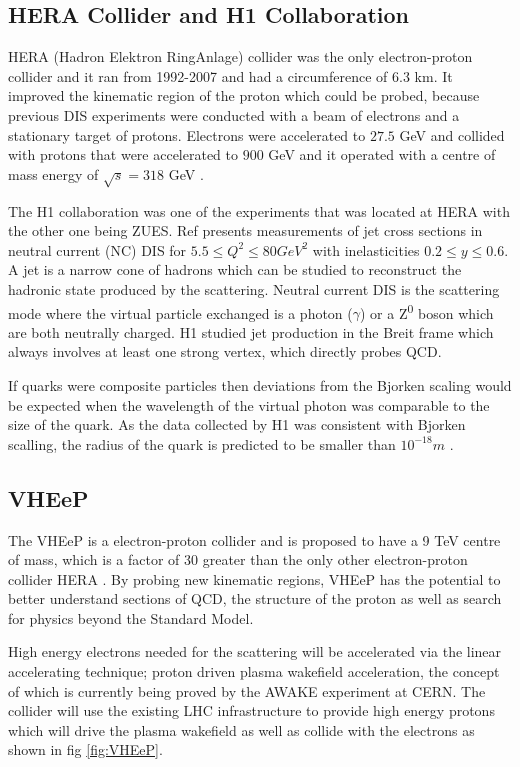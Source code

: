 \documentclass[journal, a4paper,11pt]{IEEEtran}
\begin{document}
\subsection*{\textbf{HERA Collider and H1 Collaboration}}

HERA (Hadron Elektron RingAnlage) collider was the only electron-proton collider and it ran from 1992-2007 and had a circumference of 6.3 km. It improved the kinematic region of the proton which could be probed, because previous DIS experiments were conducted with a beam of electrons and a stationary target of protons. Electrons were accelerated to $27.5$ GeV and collided with protons that were accelerated to $900$ GeV \cite{Modern} and it operated with a centre of mass energy of $\sqrt{s} = 318$ GeV \cite{1308}.

The H1 collaboration \cite{H1} was one of the experiments that was located at HERA with the other one being ZUES. Ref \cite{H1} presents measurements of jet cross sections in neutral current (NC) DIS for $5.5 \leq Q^2 \leq 80 GeV^2$ with inelasticities $0.2 \leq y \leq 0.6$. A jet is a narrow cone of hadrons which can be studied to reconstruct the hadronic state produced by the scattering. Neutral current DIS is the scattering mode where the virtual particle exchanged is a photon ($\gamma$) or a Z\textsuperscript{0} boson which are both neutrally charged. H1 studied jet production in the Breit frame which always involves at least one strong vertex, which directly probes QCD.

If quarks were composite particles then deviations from the Bjorken scaling would be expected when the wavelength of the virtual photon was comparable to the size of the quark. As the data collected by H1 was consistent with Bjorken scalling, the radius of the quark is predicted to be smaller than $10^{-18}m$ \cite{Modern}.

\subsection*{\textbf{VHEeP}}

The VHEeP \cite{VHEeP} is a electron-proton collider and is proposed to have a 9 TeV centre of mass, which is a factor of 30 greater than the only other electron-proton collider HERA \cite{HERA}. By probing new kinematic regions, VHEeP has the potential to better understand sections of QCD, the structure of the proton as well as search for physics beyond the Standard Model.

High energy electrons needed for the scattering will be accelerated via the linear accelerating technique; proton driven plasma wakefield acceleration, the concept of which is currently being proved by the AWAKE experiment at CERN. The collider will use the existing LHC infrastructure to provide high energy protons which will drive the plasma wakefield as well as collide with the electrons as shown in fig \ref{fig:VHEeP}.
\end{document}
